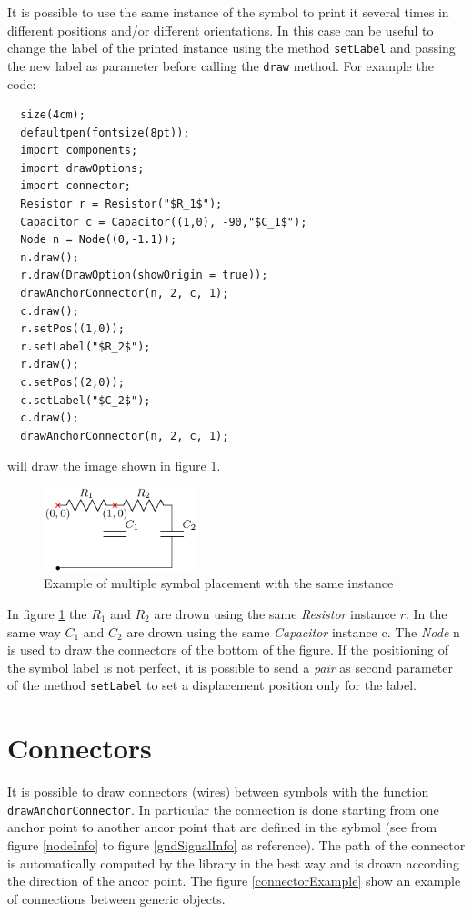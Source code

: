 \documentclass[a4paper,12pt]{report}
\begin{document}
It is possible to use the same instance of the symbol to print it several times in different positions and/or different orientations. In this case can be useful to change the label of the printed instance using the method \texttt{setLabel} and passing the new label as parameter before calling the \texttt{draw} method. For example the code:
\begin{lstlisting}
  size(4cm);
  defaultpen(fontsize(8pt));
  import components;
  import drawOptions;
  import connector;
  Resistor r = Resistor("$R_1$");
  Capacitor c = Capacitor((1,0), -90,"$C_1$");
  Node n = Node((0,-1.1));
  n.draw();
  r.draw(DrawOption(showOrigin = true));
  drawAnchorConnector(n, 2, c, 1);
  c.draw();
  r.setPos((1,0));
  r.setLabel("$R_2$");
  r.draw();
  c.setPos((2,0));
  c.setLabel("$C_2$");
  c.draw();
  drawAnchorConnector(n, 2, c, 1);
\end{lstlisting}
will draw the image shown in figure \ref{placingExample3}.
\begin{figure}[ht]
  \centering
  \includegraphics[width=0.4\textwidth]{placingExample3.pdf}
  \caption{Example of multiple symbol placement with the same instance}
  \label{placingExample3}
\end{figure}

In figure \ref{placingExample3} the $R_1$ and $R_2$ are drown using the same \emph{Resistor} instance $r$. In the same way $C_1$ and $C_2$ are drown using the same \emph{Capacitor} instance c. The \emph{Node} n is used to draw the connectors of the bottom of the figure. If the positioning of the symbol label is not perfect, it is possible to send a \emph{pair} as second parameter of the method \texttt{setLabel} to set a displacement position only for the label. 

\clearpage
\section*{Connectors}

It is possible to draw connectors (wires) between symbols with the function \texttt{drawAnchorConnector}. In particular the connection is done starting from one anchor point to another ancor point that are defined in the sybmol (see from figure \ref{nodeInfo} to figure \ref{gndSignalInfo} as reference). The path of the connector is automatically computed by the library in the best way and is drown according the direction of the ancor point. The figure \ref{connectorExample} show an example of connections between generic objects.
\end{document}
